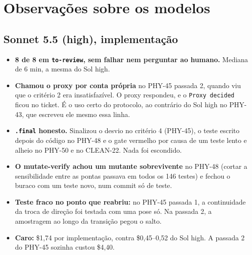 \documentclass[11pt,a4paper]{article}
\begin{document}
\section{Observações sobre os modelos}

\subsection*{Sonnet 5.5 (high), implementação}
\begin{itemize}
  \item \textbf{8 de 8 em \texttt{to-review}, sem falhar nem perguntar ao
        humano.} Mediana de 6 min, a mesma do Sol high.
  \item \textbf{Chamou o proxy por conta própria} no PHY-45 passada 2, quando
        viu que o critério 2 era insatisfazível. O proxy respondeu, e o
        \texttt{Proxy decided} ficou no ticket. É o uso certo do protocolo, ao
        contrário do Sol high no PHY-43, que escreveu ele mesmo essa linha.
  \item \textbf{\texttt{.final} honesto.} Sinalizou o desvio no critério 4
        (PHY-45), o teste escrito depois do código no PHY-48 e o gate
        vermelho por causa de um teste lento e alheio no PHY-50 e no CLEAN-22.
        Nada foi escondido.
  \item \textbf{O mutate-verify achou um mutante sobrevivente} no PHY-48
        (cortar a sensibilidade entre as pontas passava em todos os 146
        testes) e fechou o buraco com um teste novo, num commit só de teste.
  \item \textbf{Teste fraco no ponto que reabriu:} no PHY-45 passada 1, a
        continuidade da troca de direção foi testada com uma pose só. Na
        passada 2, a amostragem ao longo da transição pegou o salto.
  \item \textbf{Caro:} \$1,74 por implementação, contra \$0,45--0,52 do Sol
        high. A passada 2 do PHY-45 sozinha custou \$4,40.
\end{itemize}
\end{document}
